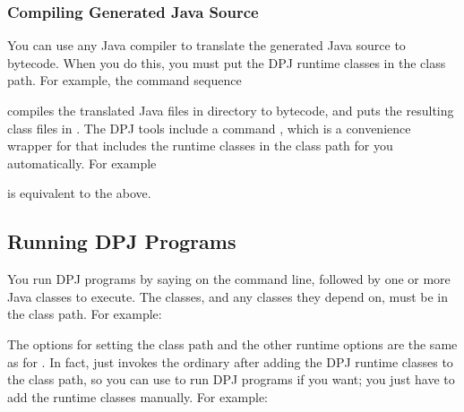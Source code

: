 \subsubsection{Compiling Generated Java Source}

You can use any Java compiler to translate the generated Java source
to bytecode.  When you do this, you must put the DPJ runtime classes
in the class path.  For example, the command sequence
%
\begin{description}
\item {}
\item {}
\end{description}
%
compiles the translated Java files in directory  to
bytecode, and puts the resulting class files in .  The
DPJ tools include a command , which is a convenience
wrapper for  that includes the runtime classes in the class
path for you automatically.  For example
%
\begin{description}
\item {}
\item {}
\end{description}
%
is equivalent to the above.  


\subsection{Running DPJ Programs}
\label{sec:running}

You run DPJ programs by saying  on the command line, followed
by one or more Java classes to execute.  The classes, and any classes
they depend on, must be in the class path.  For example:
%
\begin{description}
\item {}
\end{description}
%
The options for setting the class path and the other runtime options
are the same as for .  In fact,  just invokes the
ordinary  after adding the DPJ runtime classes to the class
path, so you can use  to run DPJ programs if you want; you
just have to add the runtime classes manually.  For example:
%
\begin{description}
\item {}
\end{description}

